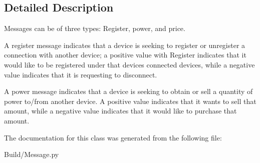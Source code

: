 \subsection{Detailed Description}
Messages can be of three types\+: Register, power, and price. 

A register message indicates that a device is seeking to register or unregister a connection with another device; a positive value with Register indicates that it would like to be registered under that device\textquotesingle{}s connected devices, while a negative value indicates that it is requesting to disconnect.

A power message indicates that a device is seeking to obtain or sell a quantity of power to/from another device. A positive value indicates that it wants to sell that amount, while a negative value indicates that it would like to purchase that amount. 

The documentation for this class was generated from the following file\+:\begin{DoxyCompactItemize}
\item 
Build/Message.\+py\end{DoxyCompactItemize}
